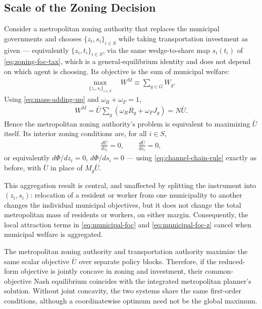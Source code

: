 \documentclass[12pt, a4paper]{article}
\theoremstyle{definition}
\theoremstyle{remark}
\begin{document}
\subsection{Scale of the Zoning Decision}

Consider a metropolitan zoning authority that replaces the municipal governments and chooses $\{z_i,s_i\}_{i\in S}$ while taking transportation investment as given — equivalently $\{z_i,t_i\}_{i\in S}$, via the same wedge-to-share map $s_i(t_i)$ of \eqref{eq:zoning-foc-tax}, which is a general-equilibrium identity and does not depend on which agent is choosing. Its objective is the sum of municipal welfare:
\begin{align}
    \label{eq:metro-zoning-problem}
    \max_{\{z_i,s_i\}_{i\in S}}
    \quad
    W^M
    \equiv
    \sum_{g\in G}W_g.
\end{align}
Using \eqref{eq:mass-adding-up} and $\omega_R+\omega_F=1$,
\begin{align}
    \label{eq:aggregate-municipal-welfare}
    W^M
    =
    \bar U
    \sum_g
    \left(
    \omega_RR_g+\omega_FJ_g
    \right)
    =
    N\bar U.
\end{align}
Hence the metropolitan zoning authority's problem is equivalent to maximizing $\bar U$ itself. Its interior zoning conditions are, for all $i\in S$,
\begin{align}
    \label{eq:metro-zoning-foc}
    \frac{d\bar U}{dz_i}=0,
    \qquad
    \frac{d\bar U}{ds_i}=0,
\end{align}
or equivalently $d\Phi/dz_i=0$, $d\Phi/ds_i=0$ — using \eqref{eq:channel-chain-rule} exactly as before, with $\bar U$ in place of $M_g\bar U$.

This aggregation result is central, and unaffected by splitting the instrument into $(z_i,s_i)$: relocation of a resident or worker from one municipality to another changes the individual municipal objectives, but it does not change the total metropolitan mass of residents or workers, on either margin. Consequently, the local attraction terms in \eqref{eq:municipal-foc} and \eqref{eq:municipal-foc-z} cancel when municipal welfare is aggregated.

The metropolitan zoning authority and transportation authority maximize the same scalar objective $\bar U$ over separate policy blocks. Therefore, if the reduced-form objective is jointly concave in zoning and investment, their common-objective Nash equilibrium coincides with the integrated metropolitan planner's solution. Without joint concavity, the two systems share the same first-order conditions, although a coordinatewise optimum need not be the global maximum.
\end{document}
